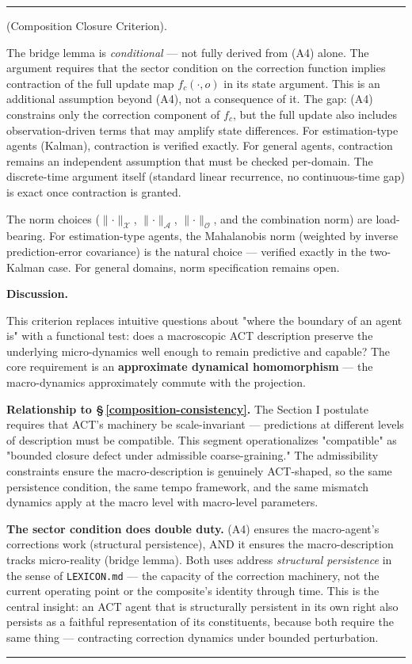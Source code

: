 \documentclass[11pt,oneside]{article}
\newcounter{claim}[section]
\renewcommand{\theclaim}{\thesection.\arabic{claim}}
\newenvironment{segment}[2]{%
  \refstepcounter{claim}%
  \bigskip\noindent\hrule\smallskip
  \noindent{\bfseries #1~\theclaim}\enskip(#2).\par\smallskip
  \noindent\ignorespaces
}{%
  \par\smallskip\noindent\hrule\bigskip
}
\newenvironment{formulation}[1][]{\begin{segment}{Formulation}{#1}}{\end{segment}}
\begin{document}
\begin{formulation}[Composition Closure Criterion]
The bridge lemma is \textit{conditional} — not fully derived from (A4) alone. The argument requires that the sector condition on the correction function implies contraction of the full update map $f_c(\cdot, o)$ in its state argument. This is an additional assumption beyond (A4), not a consequence of it. The gap: (A4) constrains only the correction component of $f_c$, but the full update also includes observation-driven terms that may amplify state differences. For estimation-type agents (Kalman), contraction is verified exactly. For general agents, contraction remains an independent assumption that must be checked per-domain. The discrete-time argument itself (standard linear recurrence, no continuous-time gap) is exact once contraction is granted.

The norm choices ($\lVert\cdot\rVert_\mathcal{X}$, $\lVert\cdot\rVert_\mathcal{A}$, $\lVert\cdot\rVert_\mathcal{O}$, and the combination norm) are load-bearing. For estimation-type agents, the Mahalanobis norm (weighted by inverse prediction-error covariance) is the natural choice — verified exactly in the two-Kalman case. For general domains, norm specification remains open.


\medskip\noindent\textbf{Discussion.}


This criterion replaces intuitive questions about "where the boundary of an agent is" with a functional test: does a macroscopic ACT description preserve the underlying micro-dynamics well enough to remain predictive and capable? The core requirement is an \textbf{approximate dynamical homomorphism} — the macro-dynamics approximately commute with the projection.

\textbf{Relationship to \S\,\ref{composition-consistency}.} The Section I postulate requires that ACT's machinery be scale-invariant — predictions at different levels of description must be compatible. This segment operationalizes "compatible" as "bounded closure defect under admissible coarse-graining." The admissibility constraints ensure the macro-description is genuinely ACT-shaped, so the same persistence condition, the same tempo framework, and the same mismatch dynamics apply at the macro level with macro-level parameters.

\textbf{The sector condition does double duty.} (A4) ensures the macro-agent's corrections work (structural persistence), AND it ensures the macro-description tracks micro-reality (bridge lemma). Both uses address \textit{structural persistence} in the sense of \texttt{LEXICON.md} — the capacity of the correction machinery, not the current operating point or the composite's identity through time. This is the central insight: an ACT agent that is structurally persistent in its own right also persists as a faithful representation of its constituents, because both require the same thing — contracting correction dynamics under bounded perturbation.


\end{formulation}
\end{document}

